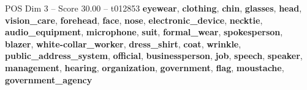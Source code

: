 \begin{textsample}{POS Dim 3 – Score 30.00 – t012853}  \label{ex:f3_pos_040}
\textbf{eyewear}, \textbf{clothing}, \textbf{chin}, \textbf{glasses}, \textbf{head}, \textbf{vision\_care}, \textbf{forehead}, \textbf{face}, \textbf{nose}, \textbf{electronic\_device}, \textbf{necktie}, \textbf{audio\_equipment}, \textbf{microphone}, \textbf{suit}, \textbf{formal\_wear}, \textbf{spokesperson}, \textbf{blazer}, \textbf{white-collar\_worker}, \textbf{dress\_shirt}, \textbf{coat}, \textbf{wrinkle}, \textbf{public\_address\_system}, \textbf{official}, \textbf{businessperson}, \textbf{job}, \textbf{speech}, \textbf{speaker}, \textbf{management}, \textbf{hearing}, \textbf{organization}, \textbf{government}, \textbf{flag}, \textbf{moustache}, \textbf{government\_agency}

\end{textsample}
